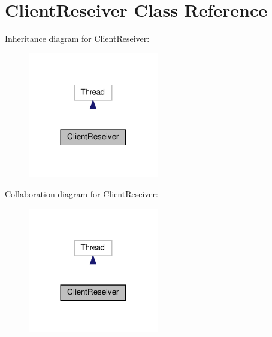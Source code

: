 \hypertarget{class_client_1_1_client_reseiver}{}\section{Client\+Reseiver Class Reference}
\label{class_client_1_1_client_reseiver}


Inheritance diagram for Client\+Reseiver\+:
\nopagebreak
\begin{figure}[H]
\begin{center}
\leavevmode
\includegraphics[width=161pt]{class_client_1_1_client_reseiver__inherit__graph}
\end{center}
\end{figure}


Collaboration diagram for Client\+Reseiver\+:
\nopagebreak
\begin{figure}[H]
\begin{center}
\leavevmode
\includegraphics[width=161pt]{class_client_1_1_client_reseiver__coll__graph}
\end{center}
\end{figure}
